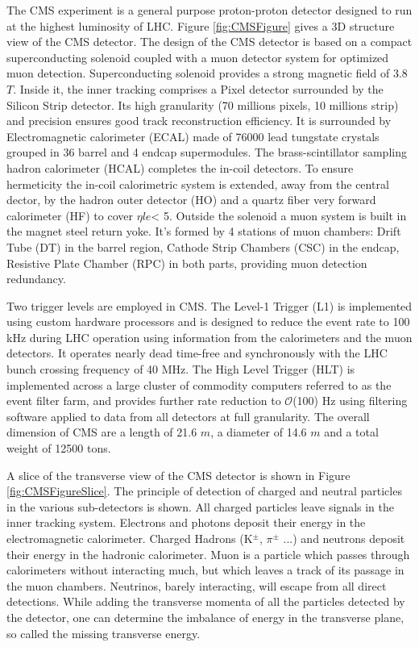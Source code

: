 The CMS experiment is a general purpose proton-proton detector designed to run 
at the highest luminosity of LHC. Figure \ref{fig:CMSFigure} gives a 3D structure view of the 
CMS detector.
The design of the CMS detector is based on a compact superconducting 
solenoid coupled with a muon detector system for optimized muon detection.
Superconducting solenoid provides a strong magnetic field of 3.8 $T$. 
Inside it, the inner tracking comprises a Pixel detector
surrounded by the Silicon Strip detector. Its high granularity (70
millions pixels, 10 millions strip) and precision ensures good track reconstruction
efficiency. It is surrounded by Electromagnetic calorimeter (ECAL) made
of 76000 lead tungstate crystals grouped in 36 barrel and 4 endcap supermodules.
The brass-scintillator sampling hadron calorimeter (HCAL) completes
the in-coil detectors. To ensure hermeticity the in-coil calorimetric system is
extended, away from the central dector, by the hadron outer detector (HO)
and a quartz fiber very forward calorimeter (HF) to cover $\eta le $< 5. Outside the
solenoid a muon system is built in the magnet steel return yoke. It's formed by
4 stations of muon chambers: Drift Tube (DT) in the barrel region, Cathode
Strip Chambers (CSC) in the endcap, Resistive Plate Chamber (RPC) in both
parts, providing muon detection redundancy. 







Two trigger levels are employed in CMS. The Level-1 Trigger (L1) is implemented using 
custom hardware processors and is designed to reduce the event rate to 100 kHz during LHC operation
using information from the calorimeters and the muon detectors. It operates nearly 
dead time-free and synchronously with the LHC bunch crossing
frequency of 40 MHz. The High Level Trigger (HLT) is implemented across a
large cluster of commodity computers referred to as the event filter farm, and
provides further rate reduction to $\mathcal{O}$(100) Hz using filtering software applied
to data from all detectors at full granularity. The overall dimension of CMS
are a length of 21.6 $m$, a diameter of 14.6 $m$ and a total weight of 12500 tons.


A slice of the transverse view of the CMS detector
is shown in Figure \ref{fig:CMSFigureSlice}. The principle of detection of charged and neutral particles in
the various sub-detectors is shown. All charged particles leave signals in the inner
tracking system. Electrons and photons deposit their energy in the electromagnetic
calorimeter. Charged Hadrons (K$^{\pm}$, $\pi^{\pm}$ ...) and neutrons deposit their energy in the
hadronic calorimeter. Muon is a particle which passes through calorimeters without
interacting much, but which leaves a track of its passage in the muon chambers.
Neutrinos, barely interacting, will escape from all direct detections. While adding
the transverse momenta of all the particles detected by the detector, one can determine
the imbalance of energy in the transverse plane, so called the missing transverse
energy.

